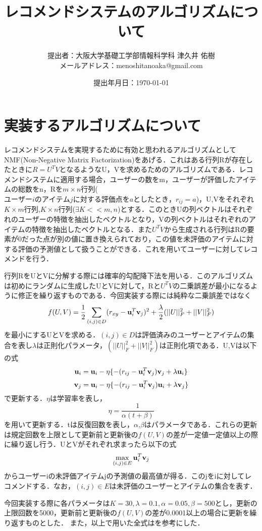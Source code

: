 \documentclass[a4j,titlepage]{jarticle}
\title{レコメンドシステムのアルゴリズムについて}
\author{提出者：大阪大学基礎工学部情報科学科 津久井 佑樹 \\ メールアドレス：menoshitanoaka@gmail.com}
\date{提出年月日：\today}
\begin{document}
\maketitle


\section{実装するアルゴリズムについて}
レコメンドシステムを実現するために有効と思われるアルゴリズムとしてNMF(Non-Negative Matrix Factorization)をあげる．これはある行列Rが存在したときに$R=U^TV$となるようなU，Vを求めるためのアルゴリズムである．レコメンドシステムに適用する場合，ユーザーの数をm，ユーザーが評価したアイテムの総数をn，Rを$m \times n$行列($ユーザーiのアイテムjに対する評価点をaとしたとき，r_{ij}=a$)，U,Vをそれぞれ$K \times m$行列,$K \times n$行列($\exists K << m,n$)とする．このときUの列ベクトルはそれぞれのユーザーの特徴を抽出したベクトルとなり，Vの列ベクトルはそれぞれのアイテムの特徴を抽出したベクトルとなる．また$U^TV$から生成される行列はRの要素が0だった点が別の値に置き換えられており，この値を未評価のアイテムに対する評価の予測値として扱うことができる．これを用いてユーザーに対してレコメンドを行う．

行列RをUとVに分解する際には確率的勾配降下法を用いる．このアルゴリズムは初めにランダムに生成したUとVに対して，Rと$U^TV$の二乗誤差が最小になるように修正を繰り返すものである．今回実装する際には純粋な二乗誤差ではなく
\[f(U,V)=\frac{1}{2}\sum_{(i,j) \in D} (r_{xy}-{\bf u}_{i}^T{\bf v}_{j})^2 + \frac{\lambda}{2}(||U||_{F}^2+||V||_{F}^2)\]
を最小にするUとVを求める．$(i,j) \in D$は評価済みのユーザーとアイテムの集合を表し$\lambda$は正則化パラメータ，$(||U||_{F}^2+||V||_{F}^2)$は正則化項である．U,Vは以下の式
\[{\bf u}_{i} = {\bf u}_{i} - \eta\{-(r_{ij}-{\bf u}_{i}^T{\bf v}_{j}){\bf v}_{j} + \lambda {\bf u}_{i}\}\]
\[{\bf v}_{j} = {\bf u}_{i} - \eta\{-(r_{ij}-{\bf u}_{i}^T{\bf v}_{j}){\bf u}_{i} + \lambda {\bf v}_{j}\}\]
で更新する．$\eta$は学習率を表し，
\[\eta = \frac{1}{\alpha(t+\beta)}\]
を用いて更新する．tは反復回数を表し，$\alpha$,$\beta$はパラメータである．これらの更新は規定回数を上限として更新前と更新後の$f(U,V)$の差が一定値一定値以上の際に繰り返し行う．UとVがそれぞれ求まったら以下の式\[\max_{(i,j)\in E}{\bf u}_{i}^T{\bf v}_{j}\]
からユーザーiの未評価アイテムjの予測値の最高値が得る．このjをiに対してレコメンドする．なお，$(i,j) \in E$は未評価のユーザーとアイテムの集合を表す．

今回実装する際に各パラメータは$K=30, \lambda=0.1, \alpha=0.05, \beta=500$とし，更新の上限回数を5000，更新前と更新後の$f(U,V)$の差が0.0001以上の場合に更新を繰り返すものとした．
また，以上で用いた全式は\cite{kamishima}を参考にした．
\end{document}
